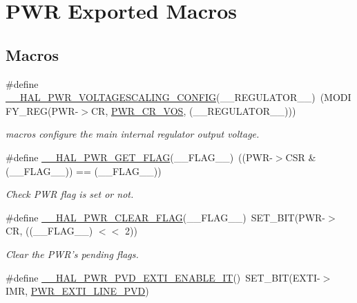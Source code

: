 \hypertarget{group___p_w_r___exported___macros}{\section{P\-W\-R Exported Macros}
\label{group___p_w_r___exported___macros}
}
\subsection*{Macros}
\begin{DoxyCompactItemize}
\item 
\#define \hyperlink{group___p_w_r___exported___macros_ga1ee778f7ff494723bd0ef04ec44b0f77}{\-\_\-\-\_\-\-H\-A\-L\-\_\-\-P\-W\-R\-\_\-\-V\-O\-L\-T\-A\-G\-E\-S\-C\-A\-L\-I\-N\-G\-\_\-\-C\-O\-N\-F\-I\-G}(\-\_\-\-\_\-\-R\-E\-G\-U\-L\-A\-T\-O\-R\-\_\-\-\_\-)~(M\-O\-D\-I\-F\-Y\-\_\-\-R\-E\-G(P\-W\-R-\/$>$C\-R, \hyperlink{group___peripheral___registers___bits___definition_gaccc33f1ba4e374e116ffa50f3a503030}{P\-W\-R\-\_\-\-C\-R\-\_\-\-V\-O\-S}, (\-\_\-\-\_\-\-R\-E\-G\-U\-L\-A\-T\-O\-R\-\_\-\-\_\-)))
\begin{DoxyCompactList}\small\item\em macros configure the main internal regulator output voltage. \end{DoxyCompactList}\item 
\#define \hyperlink{group___p_w_r___exported___macros_ga2977135bbea35b786805eea640d1c884}{\-\_\-\-\_\-\-H\-A\-L\-\_\-\-P\-W\-R\-\_\-\-G\-E\-T\-\_\-\-F\-L\-A\-G}(\-\_\-\-\_\-\-F\-L\-A\-G\-\_\-\-\_\-)~((P\-W\-R-\/$>$C\-S\-R \& (\-\_\-\-\_\-\-F\-L\-A\-G\-\_\-\-\_\-)) == (\-\_\-\-\_\-\-F\-L\-A\-G\-\_\-\-\_\-))
\begin{DoxyCompactList}\small\item\em Check P\-W\-R flag is set or not. \end{DoxyCompactList}\item 
\#define \hyperlink{group___p_w_r___exported___macros_ga96f24bf4b16c9f944cd829100bf746e5}{\-\_\-\-\_\-\-H\-A\-L\-\_\-\-P\-W\-R\-\_\-\-C\-L\-E\-A\-R\-\_\-\-F\-L\-A\-G}(\-\_\-\-\_\-\-F\-L\-A\-G\-\_\-\-\_\-)~S\-E\-T\-\_\-\-B\-I\-T(P\-W\-R-\/$>$C\-R, ((\-\_\-\-\_\-\-F\-L\-A\-G\-\_\-\-\_\-) $<$$<$ 2))
\begin{DoxyCompactList}\small\item\em Clear the P\-W\-R's pending flags. \end{DoxyCompactList}\item 
\#define \hyperlink{group___p_w_r___exported___macros_ga3180f039cf14ef78a64089f387f8f9c2}{\-\_\-\-\_\-\-H\-A\-L\-\_\-\-P\-W\-R\-\_\-\-P\-V\-D\-\_\-\-E\-X\-T\-I\-\_\-\-E\-N\-A\-B\-L\-E\-\_\-\-I\-T}()~S\-E\-T\-\_\-\-B\-I\-T(E\-X\-T\-I-\/$>$I\-M\-R, \hyperlink{group___p_w_r___private___constants_ga43a49255649e03d2d2b6b12c5c379d2b}{P\-W\-R\-\_\-\-E\-X\-T\-I\-\_\-\-L\-I\-N\-E\-\_\-\-P\-V\-D})
$$
\end{DoxyCompactItemize}
